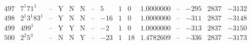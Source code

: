 \documentclass[11pt,reqno,a4letter]{article}
\numberwithin{figure}{section}
\numberwithin{table}{section}
\theoremstyle{plain}
\numberwithin{theorem}{section}
\theoremstyle{definition}
\newcommand{\NBRef}[1]{}
\begin{document}
\begin{table}[h!]
\begin{equation*}
{\begin{array}{|cc|c|ccc|c|c|ccc|c|ccc}
 497 & 7^1 71^1 & \text{--} & \text{Y} & \text{N} & \text{N} & \text{--} & 5 & 1 & 0 & 1.0000000 & \text{--} & -295 & 2837 & -3132 \\
 498 & 2^1 3^1 83^1 & \text{--} & \text{Y} & \text{N} & \text{N} & \text{--} & -16 & 1 & 0 & 1.0000000 & \text{--} & -311 & 2837 & -3148 \\
 499 & 499^1 & \text{--} & \text{Y} & \text{Y} & \text{N} & \text{--} & -2 & 1 & 0 & 1.0000000 & \text{--} & -313 & 2837 & -3150 \\
 500 & 2^2 5^3 & \text{--} & \text{N} & \text{N} & \text{Y} & \text{--} & -23 & 1 & 18 & 1.4782609 & \text{--} & -336 & 2837 & -3173 \\  
\end{array}
}
\end{equation*}

\end{table} 


\newpage
\setcounter{section}{0}
\renewcommand{\thesection}{Appendix \Alph{section}}
\renewcommand{\thesubsection}{\Alph{section}.\arabic{subsection}}
\end{document}
